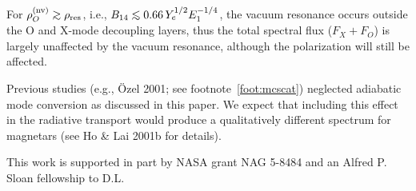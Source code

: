 \documentclass{aastex}
\def\go{\mathrel{\raise.3ex\hbox{$>$}\mkern-14mu
             \lower0.6ex\hbox{$\sim$}}}
\def\lo{\mathrel{\raise.3ex\hbox{$<$}\mkern-14mu
             \lower0.6ex\hbox{$\sim$}}}
\begin{document}
For $\rho_O^{\rm (nv)}\go\rho_{\rm res}$, i.e., $B_{14}\lo 0.66\,
Y_e^{1/2}E_1^{-1/4}$, the vacuum resonance occurs outside the O and X-mode
decoupling layers, thus the total spectral flux ($F_X+F_O$) is largely
unaffected by the vacuum resonance, although the polarization will still be
affected.

Previous studies (e.g., \"{O}zel 2001; see footnote~\ref{foot:mcscat})
neglected adiabatic mode
conversion as discussed in this paper.  We expect that including
this effect in the radiative transport would produce a qualitatively
different spectrum for magnetars (see Ho \& Lai 2001b for details).

\acknowledgments
This work is supported in part by NASA grant NAG 5-8484 and
an Alfred P. Sloan fellowship to D.L.


\end{document}
